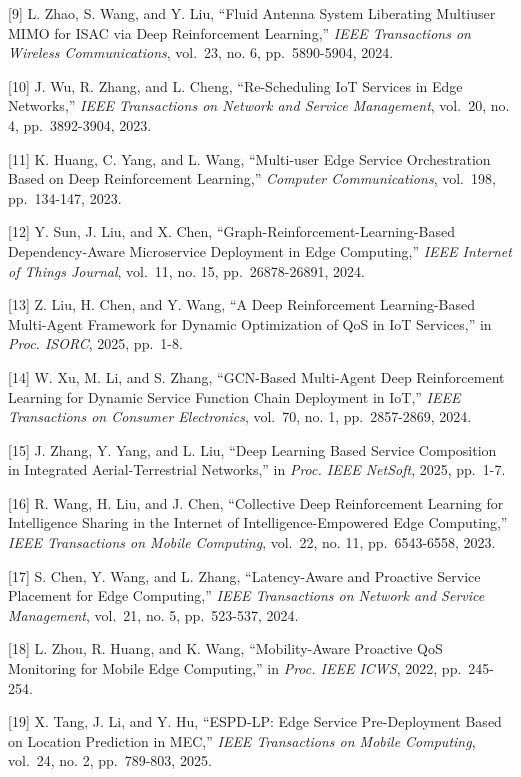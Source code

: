 \documentclass[
  10pt,
  twocolumn,
]{article}
\begin{document}
{[}9{]} L. Zhao, S. Wang, and Y. Liu, ``Fluid Antenna System Liberating
Multiuser MIMO for ISAC via Deep Reinforcement Learning,'' \emph{IEEE
	Transactions on Wireless Communications}, vol.~23, no. 6, pp.~5890-5904,
2024.

{[}10{]} J. Wu, R. Zhang, and L. Cheng, ``Re-Scheduling IoT Services in
Edge Networks,'' \emph{IEEE Transactions on Network and Service
	Management}, vol.~20, no. 4, pp.~3892-3904, 2023.

{[}11{]} K. Huang, C. Yang, and L. Wang, ``Multi-user Edge Service
Orchestration Based on Deep Reinforcement Learning,'' \emph{Computer
	Communications}, vol.~198, pp.~134-147, 2023.

{[}12{]} Y. Sun, J. Liu, and X. Chen,
``Graph-Reinforcement-Learning-Based Dependency-Aware Microservice
Deployment in Edge Computing,'' \emph{IEEE Internet of Things Journal},
vol.~11, no. 15, pp.~26878-26891, 2024.

{[}13{]} Z. Liu, H. Chen, and Y. Wang, ``A Deep Reinforcement
Learning-Based Multi-Agent Framework for Dynamic Optimization of QoS in
IoT Services,'' in \emph{Proc. ISORC}, 2025, pp.~1-8.

{[}14{]} W. Xu, M. Li, and S. Zhang, ``GCN-Based Multi-Agent Deep
Reinforcement Learning for Dynamic Service Function Chain Deployment in
IoT,'' \emph{IEEE Transactions on Consumer Electronics}, vol.~70, no. 1,
pp.~2857-2869, 2024.

{[}15{]} J. Zhang, Y. Yang, and L. Liu, ``Deep Learning Based Service
Composition in Integrated Aerial-Terrestrial Networks,'' in \emph{Proc.
	IEEE NetSoft}, 2025, pp.~1-7.

{[}16{]} R. Wang, H. Liu, and J. Chen, ``Collective Deep Reinforcement
Learning for Intelligence Sharing in the Internet of
Intelligence-Empowered Edge Computing,'' \emph{IEEE Transactions on
	Mobile Computing}, vol.~22, no. 11, pp.~6543-6558, 2023.

{[}17{]} S. Chen, Y. Wang, and L. Zhang, ``Latency-Aware and Proactive
Service Placement for Edge Computing,'' \emph{IEEE Transactions on
	Network and Service Management}, vol.~21, no. 5, pp.~523-537, 2024.

{[}18{]} L. Zhou, R. Huang, and K. Wang, ``Mobility-Aware Proactive QoS
Monitoring for Mobile Edge Computing,'' in \emph{Proc. IEEE ICWS}, 2022,
pp.~245-254.

{[}19{]} X. Tang, J. Li, and Y. Hu, ``ESPD-LP: Edge Service
Pre-Deployment Based on Location Prediction in MEC,'' \emph{IEEE
	Transactions on Mobile Computing}, vol.~24, no. 2, pp.~789-803, 2025.
\end{document}
